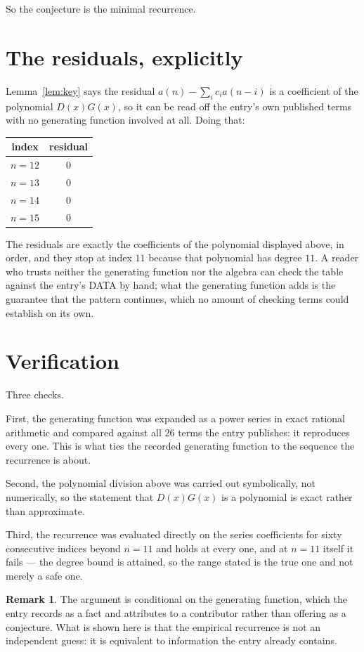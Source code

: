 \documentclass[11pt,a4paper]{article}
\theoremstyle{plain}
\theoremstyle{definition}
\newtheorem{remark}[theorem]{Remark}
\begin{document}
So the conjecture is the minimal recurrence.

\section{The residuals, explicitly}

Lemma~\ref{lem:key} says the residual $a(n)-\sum_ic_ia(n-i)$ is a coefficient of the
polynomial $D(x)G(x)$, so it can be read off the entry's own published terms with no
generating function involved at all. Doing that:
\begin{center}
\begin{tabular}{cc}
index & residual \\ \hline
$n=12$ & $0$ \\
$n=13$ & $0$ \\
$n=14$ & $0$ \\
$n=15$ & $0$
\end{tabular}
\end{center}
The residuals are exactly the coefficients of the polynomial displayed above, in order, and
they stop at index $11$ because that polynomial has degree $11$. A reader who trusts
neither the generating function nor the algebra can check the table against the entry's DATA
by hand; what the generating function adds is the guarantee that the pattern continues, which
no amount of checking terms could establish on its own.

\section{Verification}

Three checks.

First, the generating function was expanded as a power series in exact rational arithmetic and
compared against all $26$ terms the entry publishes: it reproduces every one. This is
what ties the recorded generating function to the sequence the recurrence is about.

Second, the polynomial division above was carried out symbolically, not numerically, so the
statement that $D(x)G(x)$ is a polynomial is exact rather than approximate.

Third, the recurrence was evaluated directly on the series coefficients for sixty consecutive
indices beyond $n=11$ and holds at every one, and at $n=11$ itself it fails --- the
degree bound is attained, so the range stated is the true one and not merely a safe one.

\begin{remark}
The argument is conditional on the generating function, which the entry records as a fact and
attributes to a contributor rather than offering as a conjecture. What is shown here is that
the empirical recurrence is not an independent guess: it is equivalent to information the
entry already contains.
\end{remark}
\end{document}
